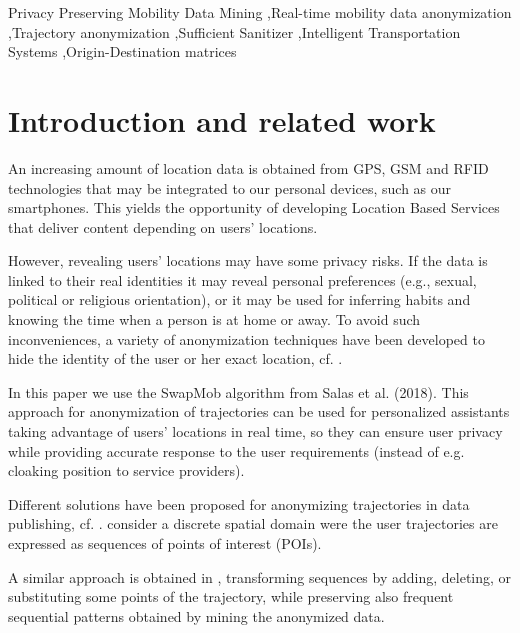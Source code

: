\documentclass[times,twocolumn,final,authoryear]{elsarticle}
\begin{document}
\begin{frontmatter}
\begin{abstract}
\end{abstract}




\begin{keyword}
\KWD Privacy Preserving Mobility Data Mining \sep Real-time mobility data anonymization \sep Trajectory anonymization \sep Sufficient Sanitizer \sep Intelligent Transportation Systems \sep Origin-Destination matrices 
\end{keyword}

\end{frontmatter}


\section{Introduction and related work}

An increasing amount of location data is obtained from GPS, GSM and RFID technologies that may be integrated to our personal devices, such as our smartphones. This yields the opportunity of developing Location Based Services that deliver content depending on users' locations.

However, revealing users' locations may have some privacy risks. If the data is linked to their real identities it may reveal personal preferences (e.g., sexual, political or religious orientation), or it may be used for inferring habits and knowing the time when a person is at home or away.
To avoid such inconveniences, a variety of anonymization techniques have been developed to hide the identity of the user or her exact location, cf. \cite{Terrovitis:2011}.


In this paper we use the SwapMob algorithm from Salas et al. (2018). This approach for anonymization of trajectories can be used for personalized assistants taking advantage of users' locations in real time, so they can ensure user privacy while providing accurate response to the user requirements (instead of e.g. cloaking position to service providers).


Different solutions have been proposed for anonymizing trajectories in data publishing, cf. \cite{Fiore:2019}. 
\cite{Terrovitis:2008} consider a discrete spatial domain were the user trajectories are expressed as sequences of points of interest (POIs).


A similar approach is obtained in \cite{Pensa2008}, transforming sequences by adding, deleting, or substituting some points of the trajectory, while preserving also frequent sequential patterns \citep{Agrawal:1995} obtained by mining the anonymized data.
\end{document}
